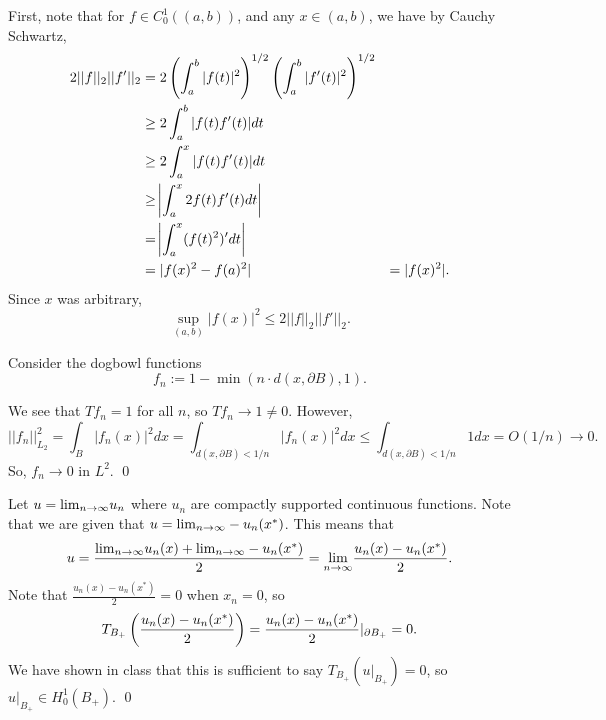 \documentclass{article}
\renewcommand{\d}{\partial}
\begin{document}
\newpage
{} 
\tri
\hop 
\solution First, note that for $f \in C_0^1((a,b))$, and any $x \in (a,b)$, we have by Cauchy Schwartz,
\begin{align*}
    2||f||_2||f'||_2 &= 2\del{\int_a^b|f(t)|^2}^{1/2}\del{\int_a^b |f'(t)|^2}^{1/2}\\
    &\ge 2\int_a^b |f(t)f'(t)|dt \\
    &\ge 2\int_a^x |f(t)f'(t)|dt \\
    &\ge \abs{\int_a^x 2f(t)f'(t)dt} \\
    &= \abs{\int_a^x (f(t)^2)'dt} \\
    &= |f(x)^2 - f(a)^2|
    &= |f(x)^2|.
\end{align*}
Since $x$ was arbitrary, \[\sup_{(a,b)} |f(x)|^2 \le 2||f||_2||f'||_2.\]

\newpage
{} 
\tri
\hop 
\solution Consider the dogbowl functions 
\[f_n := 1-\min(n\cdot d(x, \d B), 1).\]


We see that $Tf_n = 1$ for all $n$, so $Tf_n \to 1 \ne 0$. However, 
\[||f_n||_{L_2}^2 = \int_B |f_n(x)|^2dx = \int_{d(x,\d B)< 1/n} |f_n(x)|^2dx \le  \int_{d(x,\d B)< 1/n} 1 dx  = O(1/n) \to 0.\]
So, $f_n \to 0$ in $L^2$. \qed
 
\newpage
{} 
\tri
\hop 
\solution Let $u = {\lim_{n \to \infty}} u_n$ where $u_n$ are compactly supported continuous functions. Note that we are given that $u = {\lim_{n \to \infty}} -u_n(x^*)$. This means that 
\[u = \frac{ {\lim_{n \to \infty}} u_n(x) + {\lim_{n \to \infty}} -u_n(x^*)}{2}= {\lim_{n \to \infty}} \frac{u_n(x)-u_n(x^*)}{2}.\]
Note that $\frac{u_n(x)-u_n(x^*)}{2}= 0$ when $x_n =0$, so 
\[T_{B_+}\del{\frac{u_n(x)-u_n(x^*)}{2}} =\frac{u_n(x)-u_n(x^*)}{2}|_{\d B_+} = 0.\]
We have shown in class that this is sufficient to say $T_{B_+}(u|_{B_+}) = 0$, so $u|_{B_+}\in H_0^1(B_+)$. \qed
\end{document}
